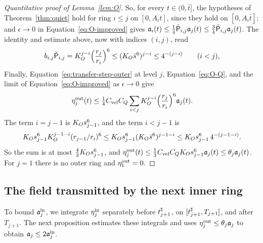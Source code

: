\begin{proof}[Quantitative proof of Lemma~\ref{lem:O}]
So, for every $t\in(0,\bar t]$, the hypotheses of Theorem~\ref{thm:quiet} hold
for ring $i\le j$ on $[0,A_it]$, since they hold on $[0,A_i\bar t]$; and
$\epsilon\to0$ in Equation~\eqref{eq:O-improved} gives
$\mathfrak{a}_i(t)\le\frac14\tilde{\mathsf{P}}_{i,j}\mathfrak{a}_j(t)\le\frac34\tilde{\mathsf{P}}_{i,j}\mathfrak{a}_j(t)$.
The identity and estimate above, now with indices $(i,j)$, read
\begin{equation}
\label{eq:O-product}
b_{i,j}\tilde{\mathsf{P}}_{i,j}
=K_{O}^{j-i}\Big(\frac{r_j}{r_i}\Big)^6
\le(K_{O}\bar s^6)^{j-i}\le4^{-(j-i)}\qquad(i<j),
\end{equation}
Finally, Equation~\eqref{eq:transfer-step-outer} at level $j$,
Equation~\eqref{eq:O-Q}, and the limit of Equation~\eqref{eq:O-improved} as
$\epsilon\to0$ give
\[
\eta^{\mathrm{out}}_j(t)\le\tfrac14C_{\mathrm{vel}} C_Q\sum_{i<j}K_{O}^{j-i}\Big(\frac{r_j}{r_i}\Big)^6\mathfrak{a}_j(t).
\]
The term $i=j-1$ is $K_{O} s_{j-1}^6$, and the term $i<j-1$ is
\[
K_{O} s_{j-1}^6K_{O}^{j-1-i}(r_{j-1}/r_i)^6\le K_{O} s_{j-1}^6(K_{O}\bar s^6)^{j-1-i}\le K_{O} s_{j-1}^6\,4^{-(j-1-i)} .
\]
So the sum is at most $\frac43K_{O} s_{j-1}^6$, and
$\eta^{\mathrm{out}}_j(t)\le\frac13C_{\mathrm{vel}} C_QK_{O} s_{j-1}^6\mathfrak{a}_j(t)\le\theta_j\mathfrak{a}_j(t)$.
For $j=1$ there is no outer ring and $\eta^{\mathrm{out}}_1=0$.
\end{proof}

\subsection{The field transmitted by the next inner ring}
\label{sec:proof-relay}

To bound $\mathfrak{a}_j^{\mathrm{in}}$, we integrate $\eta^{\mathrm{in}}_j$ separately before
$t^\sharp_{j+1}$, on $[t^\sharp_{j+1},T_{j+1}]$, and after $T_{j+1}$.
The next proposition estimates these integrals and uses
$\eta^{\mathrm{out}}_j\le\theta_j\mathfrak{a}_j$ to obtain $\mathfrak{a}_j\le2\mathfrak{a}_j^{\mathrm{in}}$.

